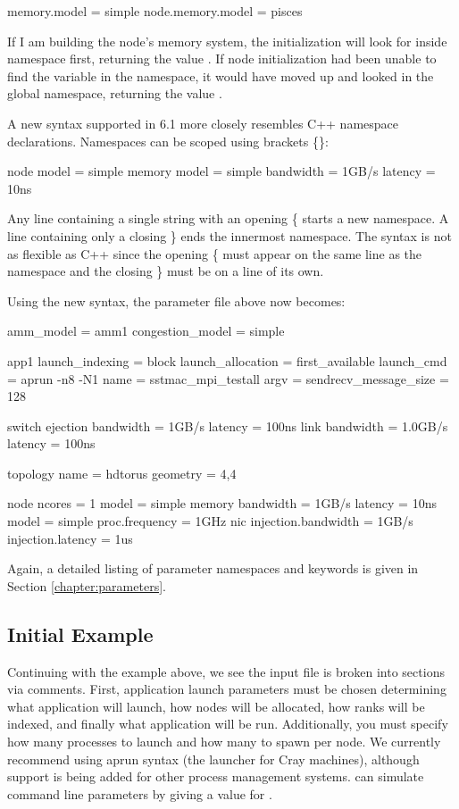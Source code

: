 \begin{ViFile}
memory.model = simple
node.memory.model = pisces
\end{ViFile}
If I am building the node's memory system, the initialization will look for  inside namespace  first, returning the value .
If node initialization had been unable to find the variable in the  namespace,
it would have moved up and looked in the global namespace, returning the value .

A new syntax supported in 6.1 more closely resembles C++ namespace declarations. 
Namespaces can be scoped using brackets \{\}:

\begin{ViFile}
node {
 model = simple
 memory {
   model = simple
   bandwidth = 1GB/s
   latency = 10ns
 }
}
\end{ViFile}
Any line containing a single string with an opening \{ starts a new namespace.
A line containing only a closing \} ends the innermost namespace.
The syntax is not as flexible as C++ since the opening \{ must appear on the same line as the namespace and the closing \} must be on a line of its own.

Using the new syntax, the parameter file above now becomes:

\begin{ViFile}
amm_model = amm1
congestion_model = simple

app1 {
 launch_indexing = block
 launch_allocation = first_available
 launch_cmd = aprun -n8 -N1
 name = sstmac_mpi_testall
 argv =
 sendrecv_message_size = 128
}

switch {
 ejection {
  bandwidth = 1GB/s
  latency = 100ns
 }
 link {
  bandwidth = 1.0GB/s
  latency = 100ns
 }
}

topology {
 name = hdtorus
 geometry = 4,4
}

node {
 ncores = 1
 model = simple
 memory {
  bandwidth = 1GB/s
  latency = 10ns
  model = simple
 }
 proc.frequency = 1GHz
 nic {
  injection.bandwidth = 1GB/s
  injection.latency = 1us
 }
}
\end{ViFile}
Again, a detailed listing of parameter namespaces and keywords is given in Section \ref{chapter:parameters}.

\subsection{Initial Example}
Continuing with the example above, we see the input file is broken into sections via comments.  
First, application launch parameters must be chosen determining what application will launch, 
how nodes will be allocated, how ranks will be indexed, and finally what application will be run.  
Additionally, you must specify how many processes to launch and how many to spawn per node.  
We currently recommend using aprun syntax (the launcher for Cray machines), 
although support is being added for other process management systems.
\sstmacro can simulate command line parameters by giving a value for .

